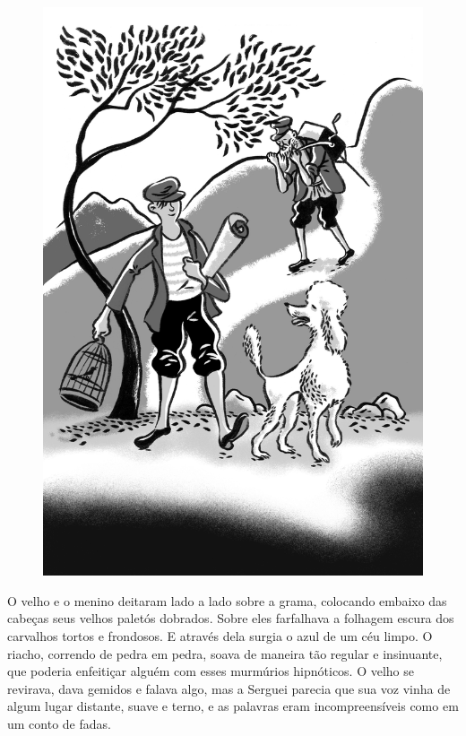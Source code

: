 \begin{figure}%
\vspace*{-1.6cm}
\hspace*{-2.3cm}\includegraphics{./imgs/cena10.jpg}
\end{figure}

O velho e o menino deitaram lado a lado sobre a grama, colocando embaixo
das cabeças seus velhos paletós dobrados. Sobre eles farfalhava a
folhagem escura dos carvalhos tortos e frondosos. E através dela surgia
o azul de um céu limpo. O riacho, correndo de pedra em pedra, soava de
maneira tão regular e insinuante, que poderia enfeitiçar alguém com
esses murmúrios hipnóticos. O velho se revirava, dava gemidos e falava
algo, mas a Serguei parecia que sua voz vinha de algum lugar distante,
suave e terno, e as palavras eram incompreensíveis como em um conto de
fadas.


